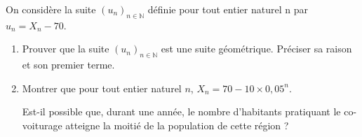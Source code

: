 \par
On considère la suite $\left(u_{n}\right)_{n\in \mathbb{N}}$ définie pour tout entier naturel n par $u_{n}=X_{n}-70$.
\begin{enumerate}
     \item
     Prouver que la suite $\left(u_{n}\right)_{n\in \mathbb{N}}$ est une suite géométrique. Préciser sa raison et son premier terme.
     \item
     Montrer que pour tout entier naturel $n$, $X_{n}=70-10 \times 0,05^{n}$.
     \par
Est-il possible que, durant une année, le nombre d'habitants pratiquant le co-voiturage atteigne la moitié de la population de cette région ?\end{enumerate}

